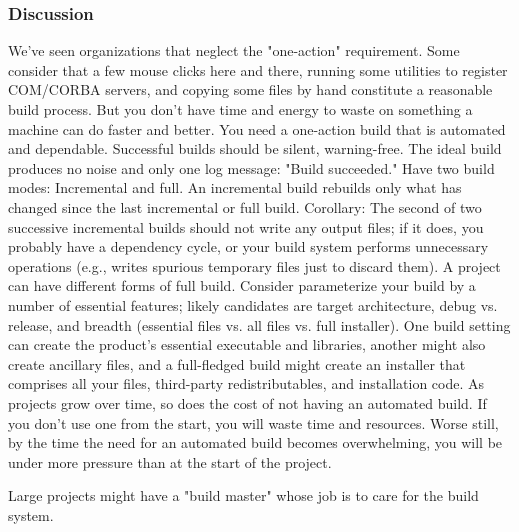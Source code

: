 \documentclass[12pt,a4paper,oneside]{article}
\begin{document}
		\subsubsection{Discussion}
		We've seen organizations that neglect the "one-action" requirement. Some consider that a few mouse clicks here and there, running some utilities to register COM/CORBA servers, and copying some files by hand constitute a reasonable build process. But you don't have time and energy to waste on something a machine can do faster and better. You need a one-action build that is automated and dependable. Successful builds should be silent, warning-free. The ideal build produces no noise and only one log message: "Build succeeded." Have two build modes: Incremental and full. An incremental build rebuilds only	what has changed since the last incremental or full build. Corollary: The second of two successive incremental builds should not write any output files; if it does, you probably have a dependency cycle, or your build system performs unnecessary operations (e.g., writes spurious temporary files just to discard them). A project can have different forms of full build. Consider parameterize your build by a number of essential features; likely candidates are target architecture, debug vs. release, and breadth (essential files vs. all files vs. full installer). One build setting can create the product's essential executable and libraries, another might also create ancillary files, and a full-fledged build might create an installer that comprises all your files, third-party redistributables, and installation code. As projects grow over time, so does the cost of not having an automated build. If you don't use one from the start, you will waste time and resources. Worse still, by the time the need for an automated build becomes overwhelming, you will be under more pressure than at the start of the project. 
		
		Large projects might have a "build master" whose job is to care for the build system.
\end{document}
